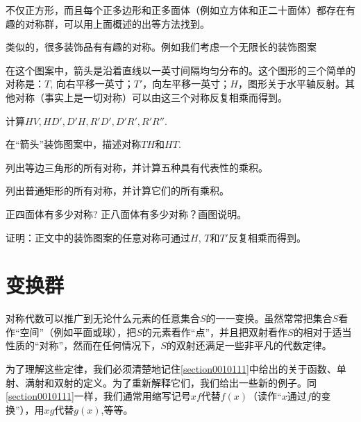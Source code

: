 不仅正方形，而且每个正多边形和正多面体（例如立方体和正二十面体）都存在有趣的对称群，可以用上面概述的出等方法找到。

类似的，很多装饰品有有趣的对称。例如我们考虑一个无限长的装饰图案

\begin{center}
\end{center}

在这个图案中，箭头是沿着直线以一英寸间隔均匀分布的。这个图形的三个简单的对称是：$T$, 向右平移一英寸；$T'$，向左平移一英寸；$H$，图形关于水平轴反射。其他对称（事实上是一切对称）可以由这三个对称反复相乘而得到。

\begin{problemset}
\item 计算$HV, HD', D'H, R'D', D'R', R'R''$.

\item 在“箭头”装饰图案中，描述对称$TH$和$HT$.

\item 列出等边三角形的所有对称，并计算五种具有代表性的乘积。

\item 列出普通矩形的所有对称，并计算它们的所有乘积。

\item 正四面体有多少对称? 正八面体有多少对称？画图说明。

\item 证明：正文中的装饰图案的任意对称可通过$H$, $T$和$T'$反复相乘而得到。

\end{problemset}



\section{变换群}\label{section0010602}
对称代数可以推广到无论什么元素的任意集合$S$的一一变换。虽然常常把集合$S$看作“空间”（例如平面或球），把$S$的元素看作“点”，并且把双射看作$S$的相对于适当性质的“对称”，然而在任何情况下，$S$的双射还满足一些非平凡的代数定律。

为了理解这些定律，我们必须清楚地记住\ref{section0010111}中给出的关于函数、单射、满射和双射的定义。为了重新解释它们，我们给出一些新的例子。同\ref{section0010111}一样，我们通常用缩写记号$xf$代替$f(x)$（读作“$x$通过$f$的变换”），用$xg$代替$g(x)$,等等。

